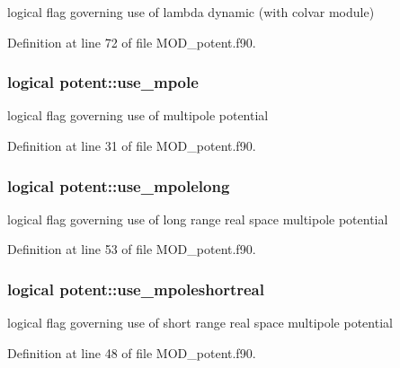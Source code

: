 logical flag governing use of lambda dynamic (with colvar module) 



Definition at line 72 of file M\-O\-D\-\_\-potent.\-f90.

\hypertarget{classpotent_a3378eb96a0d00f5db14bef5c7b5e8a65}{
\subsubsection[{use\-\_\-mpole}]{\setlength{\rightskip}{0pt plus 5cm}logical potent\-::use\-\_\-mpole}}\label{classpotent_a3378eb96a0d00f5db14bef5c7b5e8a65}


logical flag governing use of multipole potential 



Definition at line 31 of file M\-O\-D\-\_\-potent.\-f90.

\hypertarget{classpotent_ab25ad95c8d922a447b35fe4f4d582a1d}{
\subsubsection[{use\-\_\-mpolelong}]{\setlength{\rightskip}{0pt plus 5cm}logical potent\-::use\-\_\-mpolelong}}\label{classpotent_ab25ad95c8d922a447b35fe4f4d582a1d}


logical flag governing use of long range real space multipole potential 



Definition at line 53 of file M\-O\-D\-\_\-potent.\-f90.

\hypertarget{classpotent_a37a7b683869b844b2129bf9d14848171}{
\subsubsection[{use\-\_\-mpoleshortreal}]{\setlength{\rightskip}{0pt plus 5cm}logical potent\-::use\-\_\-mpoleshortreal}}\label{classpotent_a37a7b683869b844b2129bf9d14848171}


logical flag governing use of short range real space multipole potential 



Definition at line 48 of file M\-O\-D\-\_\-potent.\-f90.

